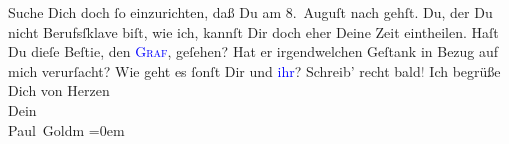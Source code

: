            Suche Dich doch ſo einzurichten, daß Du am 8. Auguſt
               nach \label{K_L02815-2v}\label{K_L02815-2h} gehſt. Du, der Du nicht Berufsſklave biſt, wie ich, kannſt Dir doch eher
               Deine {\pb}Zeit eintheilen.\pend
           \pstart
           Haſt Du dieſe 
               Beſtie, den \textsc{\textcolor{blue}{Graf}{}},
                geſehen? Hat er irgendwelchen
               Geſtank in Bezug auf mich verurſacht?\pend
           \pstart
           Wie geht es ſonſt Dir und \textcolor{blue}{ihr}{}?\pend
           \pstart
           Schreib’ recht bald\textcolor{gray}{!}\pend
           \pstart
           Ich begrüße Dich von Herzen {\\[\baselineskip]}Dein {\\[\baselineskip]}\spacefill\mbox{Paul Goldm}\pend
           \leftskip=0em{}\endnumbering{}  
      